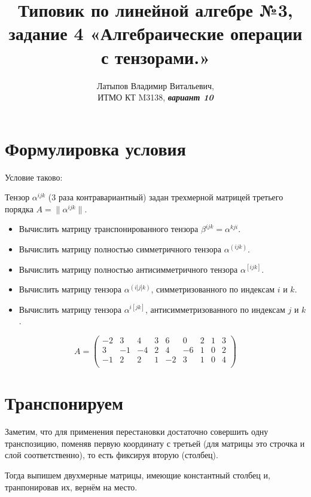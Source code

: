 \documentclass[12pt, a4paper]{article}
\author{Латыпов Владимир Витальевич, \\ ИТМО КТ M3138, \Huge{\textit{\textbf{вариант 10}}}}
\title{Типовик по линейной алгебре №3, задание 4 «Алгебраические операции с тензорами.»}
\newcommand\arr[2]{\left(\begin{array}{#1}#2\end{array}\right)}
\begin{document}
    \tit

    \section{Формулировка условия}

    \begin{statement}
        Условие таково:

        Тензор $\alpha^{ijk}$ (3 раза контравариантный) 
        задан трехмерной матрицей третьего порядка $A = \lVert \alpha^{ijk} \rVert$.

        \begin{itemize}
            \item Вычислить матрицу транспонированного тензора $\beta^{ijk} = \alpha^{kji}$.
            \item Вычислить матрицу полностью симметричного тензора $\alpha^{(ijk)}$.
            \item Вычислить матрицу полностью антисимметричного тензора $\alpha^{[ijk]}$.
            \item Вычислить матрицу тензора $\alpha^{(i|j|k)}$, симметризованного по индексам $i$ и $k$.
            \item Вычислить матрицу тензора $\alpha^{i[jk]}$, антисимметризованного по индексам $j$ и $k$.
        \end{itemize}

        \begin{equation}
            A = \arr{ccc|ccc|ccc}{
                -2 & 3 & 4 & 3 & 6 & 0 & 2 & 1 & 3 \\
                3 & -1 & -4 & 2 & 4 & -6 & 1 & 0 & 2 \\
                -1 & 2 & 2 & 1 & -2 & 3 & 1 & 0 & 4 \\
            }
        \end{equation}

    \end{statement}

    \section{Транспонируем}

    Заметим, что для применения перестановки достаточно совершить одну транспозицию, 
    поменяв первую координату с третьей (для матрицы это строчка и слой соответственно), то есть фиксируя вторую (столбец).

    Тогда выпишем двухмерные матрицы, имеющие константный столбец и, транпонировав их, вернём на место.
\end{document}
